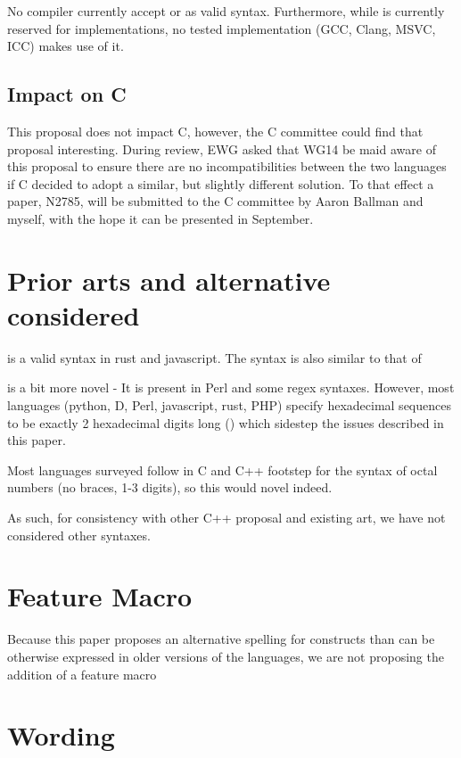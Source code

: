 \documentclass{wg21}
\begin{document}
No compiler currently accept  or  as valid syntax.
Furthermore, while  is currently reserved for implementations, no tested implementation (GCC, Clang, MSVC, ICC) makes use of it.


\subsection{Impact on C}

This proposal does not impact C, however, the C committee could find that proposal interesting.
During review, EWG asked that WG14 be maid aware of this proposal to ensure there are no incompatibilities between the two languages if C
decided to adopt a similar, but slightly different solution.
To that effect a paper, N2785, will be submitted to the C committee by Aaron Ballman and myself, with the hope it can be presented in September.


\section{Prior arts and alternative considered}

 is a valid syntax in rust and javascript.
The syntax is also similar to that of 

 is a bit more novel - It is present in Perl and some regex syntaxes.
However, most languages (python, D, Perl, javascript, rust, PHP) specify hexadecimal sequences to be exactly 2 hexadecimal digits long () which sidestep the issues described in this paper.

Most languages surveyed follow in C and C++ footstep for the syntax of octal numbers (no braces, 1-3 digits), so this would novel indeed.

As such, for consistency with other C++ proposal and existing art, we have not considered other syntaxes.

\section{Feature Macro}

Because this paper proposes an alternative spelling for constructs than can be otherwise expressed in older versions of the languages,
we are not proposing the addition of a feature macro

\section{Wording}
\end{document}
